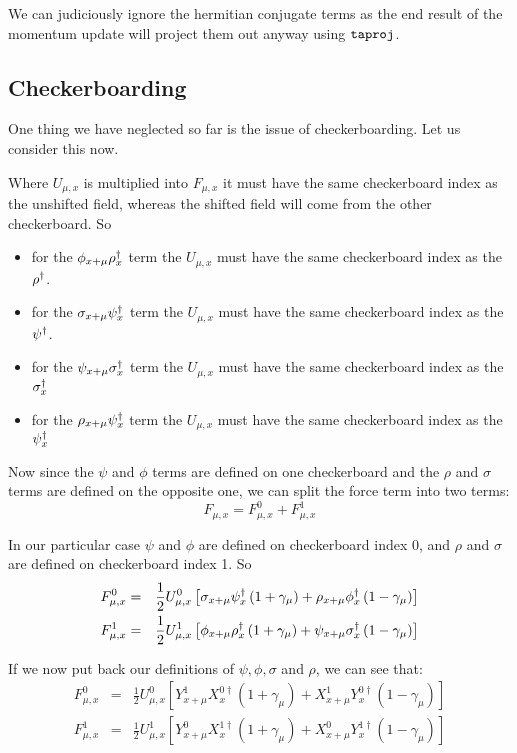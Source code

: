 \documentclass[12pt]{article}
\begin{document}
We can judiciously ignore the hermitian conjugate terms as the end result
of the momentum update will project them out anyway using $\tt taproj$.

\subsection{Checkerboarding}
One thing we have neglected so far is the issue of checkerboarding. Let us 
consider this now. 

Where $U_{\mu,x}$ is multiplied into $F_{\mu,x}$ it must have the same checkerboard index as the unshifted field, whereas the shifted field will come from the
other checkerboard. 
So 
\begin{itemize}
\item
for the $\phi_{x+\mu} \rho^{\dagger}_{x}$ term the $U_{\mu,x}$ must have the same checkerboard index as the $\rho^{\dagger}$.
\item 
for the $\sigma_{x+\mu} \psi^{\dagger}_{x}$ term the $U_{\mu,x}$ must have the same checkerboard index as the $\psi^{\dagger}$.
\item
for the $\psi_{x+\mu} \sigma^{\dagger}_{x}$ term the $U_{\mu,x}$ must have the same checkerboard index as the $\sigma^{\dagger}_{x}$
\item
for the $\rho_{x+\mu} \psi^{\dagger}_{x}$ term the $U_{\mu,x}$ must have the same checkerboard index as the $\psi^{\dagger}_{x}$
\end{itemize}

Now since the $\psi$ and $\phi$ terms are defined on one checkerboard and 
the $\rho$ and $\sigma$ terms are defined on the opposite one, we can split
the force term into two terms: 
\begin{equation}
F_{\mu,x} = F^{0}_{\mu,x} + F^{1}_{\mu,x}
\end{equation}

In our particular case $\psi$ and $\phi$ are defined on checkerboard index
0, and $\rho$ and $\sigma$ are defined on checkerboard index 1. So
\begin{eqnarray}
F^{0}_{\mu,x} &=& \frac{1}{2} U^{0}_{\mu,x} \left[ \sigma_{x+\mu} \psi^{\dagger}_{x} \left( 1 + \gamma_{\mu} \right) + \rho_{x+\mu} \phi^{\dagger}_{x} \left( 1 - \gamma_{\mu} \right) \right] \\
F^{1}_{\mu,x} &=& \frac{1}{2} U^{1}_{\mu,x} \left[ \phi_{x+\mu} \rho^{\dagger}_{x} \left( 1 + \gamma_{\mu} \right) + \psi_{x + \mu} \sigma^{\dagger}_{x} \left( 1 - \gamma_{\mu} \right) \right]
\end{eqnarray}

If we now put back our definitions of $\psi, \phi, \sigma$ and $\rho$, 
we can see that:
\begin{eqnarray}
 F^{0}_{\mu,x} &=& \frac{1}{2} U^{0}_{\mu,x} \left[ Y^{1}_{x+\mu} X^{0 \dagger}_{x} \left( 1 + \gamma_{\mu} \right) + X^1_{x+\mu} Y^{ 0\dagger}_{x} \left( 1 - \gamma_{\mu} \right) \right] \\
F^{1}_{\mu,x} &=& \frac{1}{2} U^{1}_{\mu,x} \left[ Y^0_{x+\mu} X^{1 \dagger}_{x} \left( 1 + \gamma_{\mu} \right) + X^{0}_{x + \mu} Y^{1 \dagger }_{x} \left( 1 - \gamma_{\mu} \right) \right]
\end{eqnarray}
\end{document}
